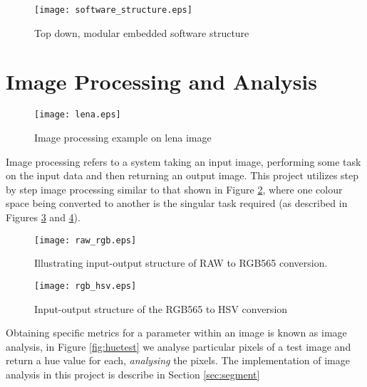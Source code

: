 \documentclass[11pt, a4paper, oneside]{Thesis} %
\begin{document}
\begin{figure}[h]
  \begin{center}
    \texttt{[image: software\_structure.eps]}
  \end{center}
  \caption{Top down, modular embedded software structure}
  \label{fig:software_design}
\end{figure}


\section{Image Processing and Analysis}\label{sec:image_simulation}

\begin{figure}[h]
  \begin{center}
    \texttt{[image: lena.eps]}
  \end{center}
  \caption{Image processing example on lena image \cite{tolga2008}}
  \label{fig:lena}
\end{figure}

Image processing refers to a system taking an input image, performing some task on the input data and then returning an output image. This project utilizes step by step image processing similar to that shown in Figure \ref{fig:lena}, where one colour space being converted to another is the singular task required (as described in Figures \ref{fig:raw_rgb} and \ref{fig:rgb_hsv}).  

\begin{figure}[h]
  \begin{center}
    \texttt{[image: raw\_rgb.eps]}
  \end{center}
  \caption{Illustrating input-output structure of RAW to RGB565 conversion.}
  \label{fig:raw_rgb}
\end{figure}

\begin{figure}[h]
  \begin{center}
    \texttt{[image: rgb\_hsv.eps]}
  \end{center}
  \caption{Input-output structure of the RGB565 to HSV conversion}
  \label{fig:rgb_hsv}
\end{figure}

Obtaining specific metrics for a parameter within an image is known as image analysis, in Figure \ref{fig:huetest} we analyse particular pixels of a test image and return a hue value for each, \emph{analysing} the pixels. The implementation of image analysis in this project is describe in Section \ref{sec:segment}
\end{document}
